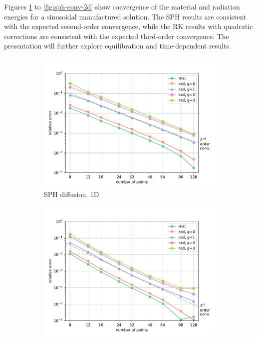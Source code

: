 \documentclass[11pt]{article}
\begin{document}
Figures \ref{fig:sph-conv} to \ref{fig:sph-conv-2d} show convergence of the material and radiation energies for a sinusoidal manufactured solution. The SPH results are consistent with the expected second-order convergence, while the RK results with quadratic corrections are consistent with the expected third-order convergence. The presentation will further explore equilibration and time-dependent results. 

\begin{figure}[htbp]
\centering
\begin{subfigure}{0.32\textwidth}
  \includegraphics[width=\linewidth]{../figs/ManufacturedConvergence1d}
  \caption{SPH diffusion, 1D}
  \label{fig:sph-conv}
\end{subfigure}
\hfill
\begin{subfigure}{0.32\textwidth}
  \includegraphics[width=\linewidth]{../figs/ManufacturedConvergenceRK1d}

\end{subfigure}
\end{figure}
\end{document}
